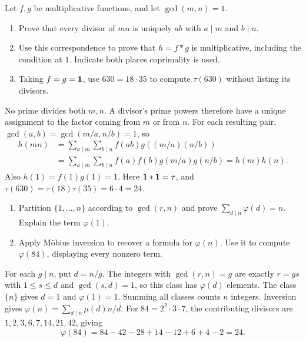 Let $f,g$ be multiplicative functions, and let $\gcd(m,n)=1$.
\begin{enumerate}
 \item Prove that every divisor of $mn$ is uniquely $ab$ with
 $a\mid m$ and $b\mid n$. 
 \item Use this correspondence to prove that $h=f*g$ is multiplicative,
 including the condition at $1$. Indicate both places coprimality is used.
 \item Taking $f=g=\mathbf{1}$, use $630=18\cdot35$ to compute
 $\tau(630)$ without listing its divisors. 
\end{enumerate}
\begin{solution}
No prime divides both $m,n$. A divisor's prime powers therefore have a
unique assignment to the factor coming from $m$ or from $n$.
For each resulting pair, $\gcd(a,b)=\gcd(m/a,n/b)=1$, so
\[
 \begin{aligned}
 h(mn)&=\sum_{a\mid m}\sum_{b\mid n}f(ab)g((m/a)(n/b))\\
 &=\sum_{a\mid m}\sum_{b\mid n}f(a)f(b)g(m/a)g(n/b)=h(m)h(n).
 \end{aligned}
\]
Also $h(1)=f(1)g(1)=1$. Here $\mathbf{1}*\mathbf{1}=\tau$, and
$\tau(630)=\tau(18)\tau(35)=6\cdot4=24$.
\end{solution}

\studentbreak
{}

\begin{enumerate}
 \item Partition $\{1,\ldots,n\}$ according to $\gcd(r,n)$ and prove
 $\sum_{d\mid n}\varphi(d)=n$. Explain the term $\varphi(1)$. 
 \item Apply M\"obius inversion to recover a formula for $\varphi(n)$.
 Use it to compute $\varphi(84)$, displaying every nonzero term. 
\end{enumerate}
\begin{solution}
For each $g\mid n$, put $d=n/g$. The integers with $\gcd(r,n)=g$
are exactly $r=gs$ with $1\le s\le d$ and $\gcd(s,d)=1$,
so this class has $\varphi(d)$ elements. The class $\{n\}$ gives
$d=1$ and $\varphi(1)=1$. Summing all classes counts $n$ integers.
Inversion gives $\varphi(n)=\sum_{d\mid n}\mu(d)n/d$.
For $84=2^2\cdot3\cdot7$, the contributing divisors are
$1,2,3,6,7,14,21,42$, giving
\[
 \varphi(84)=84-42-28+14-12+6+4-2=24.
\]
\end{solution}

